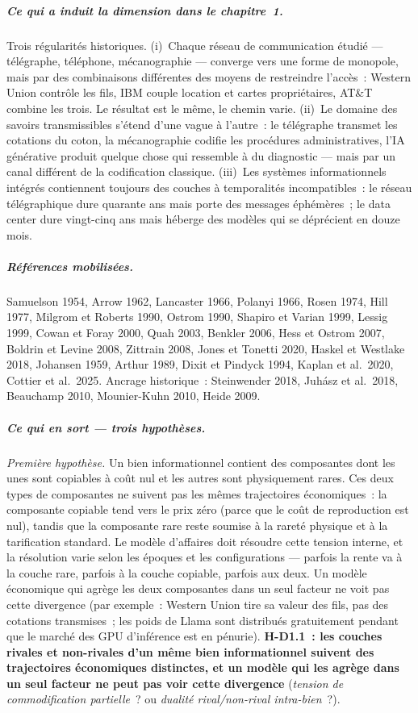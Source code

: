 \subparagraph{Ce qui a induit la dimension dans le chapitre~1.}
Trois régularités historiques. (i)~Chaque réseau de communication étudié --- télégraphe, téléphone, mécanographie --- converge vers une forme de monopole, mais par des combinaisons différentes des moyens de restreindre l'accès~: Western Union contrôle les fils, IBM couple location et cartes propriétaires, AT\&T combine les trois. Le résultat est le même, le chemin varie. (ii)~Le domaine des savoirs transmissibles s'étend d'une vague à l'autre~: le télégraphe transmet les cotations du coton, la mécanographie codifie les procédures administratives, l'IA générative produit quelque chose qui ressemble à du diagnostic --- mais par un canal différent de la codification classique. (iii)~Les systèmes informationnels intégrés contiennent toujours des couches à temporalités incompatibles~: le réseau télégraphique dure quarante ans mais porte des messages éphémères~; le data center dure vingt-cinq ans mais héberge des modèles qui se déprécient en douze mois.

\subparagraph{Références mobilisées.}
Samuelson 1954, Arrow 1962, Lancaster 1966, Polanyi 1966, Rosen 1974, Hill 1977, Milgrom et Roberts 1990, Ostrom 1990, Shapiro et Varian 1999, Lessig 1999, Cowan et Foray 2000, Quah 2003, Benkler 2006, Hess et Ostrom 2007, Boldrin et Levine 2008, Zittrain 2008, Jones et Tonetti 2020, Haskel et Westlake 2018, Johansen 1959, Arthur 1989, Dixit et Pindyck 1994, Kaplan et al.\ 2020, Cottier et al.\ 2025. Ancrage historique~: Steinwender 2018, Juhász et al.\ 2018, Beauchamp 2010, Mounier-Kuhn 2010, Heide 2009.

\subparagraph{Ce qui en sort --- trois hypoth\`eses.}

\emph{Premi\`ere hypoth\`ese.} Un bien informationnel contient des composantes dont les unes sont copiables \`a co\^ut nul et les autres sont physiquement rares. Ces deux types de composantes ne suivent pas les m\^emes trajectoires \'economiques~: la composante copiable tend vers le prix z\'ero (parce que le co\^ut de reproduction est nul), tandis que la composante rare reste soumise \`a la raret\'e physique et \`a la tarification standard. Le mod\`ele d'affaires doit r\'esoudre cette tension interne, et la r\'esolution varie selon les \'epoques et les configurations --- parfois la rente va \`a la couche rare, parfois \`a la couche copiable, parfois aux deux. Un mod\`ele \'economique qui agr\`ege les deux composantes dans un seul facteur ne voit pas cette divergence (par exemple~: Western Union tire sa valeur des fils, pas des cotations transmises~; les poids de Llama sont distribu\'es gratuitement pendant que le march\'e des GPU d'inf\'erence est en p\'enurie). \textbf{H-D1.1~: les couches rivales et non-rivales d'un m\^eme bien informationnel suivent des trajectoires \'economiques distinctes, et un mod\`ele qui les agr\`ege dans un seul facteur ne peut pas voir cette divergence} (\emph{tension de commodification partielle}~? ou \emph{dualit\'e rival/non-rival intra-bien}~?).

